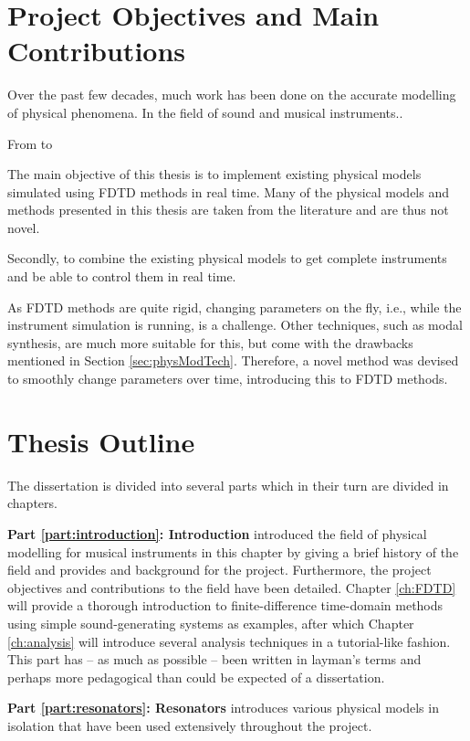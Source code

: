 \section{Project Objectives and Main Contributions}
Over the past few decades, much work has been done on the accurate modelling of physical phenomena. In the field of sound and musical instruments.. 

From \cite{Fletcher1998} to \cite{Bilbao2019CMJb}



The main objective of this thesis is to implement existing physical models simulated using FDTD methods in real time. Many of the physical models and methods presented in this thesis are taken from the literature and are thus not novel. 

Secondly, to combine the existing physical models to get complete instruments and be able to control them in real time.

As FDTD methods are quite rigid, changing parameters on the fly, i.e., while the instrument simulation is running, is a challenge.  Other techniques, such as modal synthesis, are much more suitable for this, but come with the drawbacks mentioned in Section \ref{sec:physModTech}. Therefore, a novel method was devised to smoothly change parameters over time, introducing this to FDTD methods. 

\section{Thesis Outline}
The dissertation is divided into several parts which in their turn are divided in chapters. 

\textbf{Part \ref{part:introduction}: Introduction} introduced the field of physical modelling for musical instruments in this chapter by giving a brief history of the field and provides and background for the project. Furthermore, the project objectives and contributions to the field have been detailed. Chapter \ref{ch:FDTD} will provide a thorough introduction to finite-difference time-domain methods using simple sound-generating systems as examples, after which Chapter \ref{ch:analysis} will introduce several analysis techniques in a tutorial-like fashion. This part has -- as much as possible -- been written in layman's terms and perhaps more pedagogical than could be expected of a dissertation. 

\textbf{Part \ref{part:resonators}: Resonators} introduces various physical models in isolation that have been used extensively throughout the project. 

